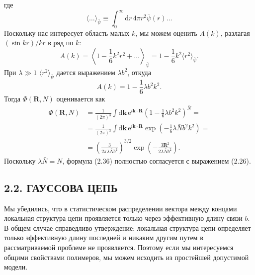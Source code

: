 \documentclass[12pt,a4paper]{article}
\begin{document}
где
\begin{equation}
\langle\dots\rangle_{\bar{\psi}} \equiv \int_0^\infty\!\mathrm{d}r\,4\pi r^2\bar{\psi}(r)\dots \tag{2.33}
\end{equation}
Поскольку нас интересует область малых $k$, мы можем оценить $A(k)$, разлагая $(\sin kr)/kr$ в ряд по $k$:
\begin{equation}
A(k) = \left\langle 1 - \frac{1}{6}k^2 r^2 + \dots\right\rangle_{\!\bar{\psi}} = 1 - \frac{1}{6}k^2\langle r^2\rangle_{\bar{\psi}}. \tag{2.34}
\end{equation}
При $\lambda \gg 1$ $\langle r^2\rangle_{\bar{\psi}}$ дается выражением $\lambda b^2$, откуда
\begin{equation}
A(k) = 1 - \frac{1}{6}\lambda b^2 k^2. \tag{2.35}
\end{equation}
Тогда $\Phi(\boldsymbol{R}, N)$ оценивается как
\begin{align}
\Phi(\boldsymbol{R}, N) &= \frac{1}{(2\pi)^3}\int\!\mathrm{d}\boldsymbol{k}\,\mathrm{e}^{i\boldsymbol{k}\cdot\boldsymbol{R}}\left(1 - \frac{1}{6}\lambda b^2 k^2\right)^{\bar{N}} = \nonumber\\
&= \frac{1}{(2\pi)^3}\int\!\mathrm{d}\boldsymbol{k}\,\mathrm{e}^{i\boldsymbol{k}\cdot\boldsymbol{R}}\exp\left(-\frac{1}{6}\lambda\bar{N}b^2 k^2\right) = \nonumber\\
&= \left(\frac{3}{2\pi\lambda\bar{N}b^2}\right)^{3/2}\exp\left(-\frac{3\boldsymbol{R}^2}{2\lambda\bar{N}b^2}\right). \tag{2.36}
\end{align}
Поскольку $\lambda\bar{N} = N$, формула (2.36) полностью согласуется с выражением (2.26).

\subsection*{2.2. ГАУССОВА ЦЕПЬ}

Мы убедились, что в статистическом распределении вектора между концами локальная структура цепи проявляется только через эффективную длину связи $b$. В общем случае справедливо утверждение: локальная структура цепи определяет только эффективную длину последней и никаким другим путем в рассматриваемой проблеме не проявляется. Поэтому если мы интересуемся общими свойствами полимеров, мы можем исходить из простейшей допустимой модели.
\end{document}
